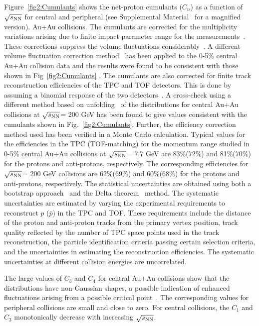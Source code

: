 \documentclass[10pt,aps,prc,twocolumn,floatfix]{revtex4-1}
\newcommand{\rootsnn} {\mbox{$\sqrt{s_{\rm NN}}$}\xspace}
\begin{document}
Figure~\ref{fig2:Cumulants} shows the net-proton
cumulants ($C_{n}$) as a function of \rootsnn for central and peripheral (see Supplemental Material~\cite{sup} for a magnified version). Au+Au
collisions. The cumulants are
corrected for the multiplicity variations arising due to finite
impact parameter range for the
measurements~\cite{Luo:2013bmi}. These corrections suppress the volume
fluctuations considerably~\cite{Luo:2013bmi,Sugiura:2019toh}.
A different volume fluctuation correction method~\cite{Braun-Munzinger:2016yjz} has been
applied to the 0-5\% central Au+Au collision data and the results were
found to be consistent with those shown in Fig~\ref{fig2:Cumulants} .
The cumulants are also
corrected for finite track reconstruction efficiencies of the TPC and
TOF detectors.
This is done by assuming a binomial response of the two detectors~\cite{Adamczyk:2013dal,Luo:2014rea}.
A cross-check using a different 
method based on unfolding~\cite{sup} of the distributions for central Au+Au collisions at \rootsnn = 200 GeV has been found to give values consistent with the cumulants shown in
Fig.~\ref{fig2:Cumulants}. Further, the efficiency
  correction method used has been
verified in a Monte Carlo calculation.
Typical values for the
efficiencies in the TPC (TOF-matching)
for the momentum range studied in 0-5\% central Au+Au collisions at \rootsnn =
7.7 GeV are 83\%(72\%) and 81\%(70\%) for the protons and
anti-protons, respectively. The corresponding efficiencies for \rootsnn =
200 GeV collisions are 62\%(69\%) and 60\%(68\%) for the protons and
anti-protons, respectively.  The statistical uncertainties are obtained using
both a bootstrap approach~\cite{Pandav:2018bdx,Luo:2014rea} and the Delta theorem~\cite{Pandav:2018bdx,Luo:2014rea, Luo:2011tp}
method. The systematic uncertainties are estimated by
varying the experimental requirements to reconstruct $p$ 
(${\bar{p}}$) in the TPC and TOF. These requirements include the distance of the proton
and anti-proton tracks from the primary vertex position,
track quality reflected by the number of TPC space
points used in the track reconstruction, the particle
identification criteria passing certain selection criteria, and the uncertainties in estimating the
reconstruction efficiencies. The systematic uncertainties at different
collision energies are uncorrelated.

The large values of $C_{3}$ and $C_{4}$ for central
Au+Au collisions show that the distributions have
non-Gaussian shapes,
a possible indication of enhanced fluctuations
arising from a possible critical point~\cite{Stephanov:2008qz,Asakawa:2009aj}.
The corresponding values for peripheral collisions are small and close to
zero. For central collisions, the $C_{1}$ and $C_{3}$
monotonically decrease with increasing \rootsnn.
\end{document}
